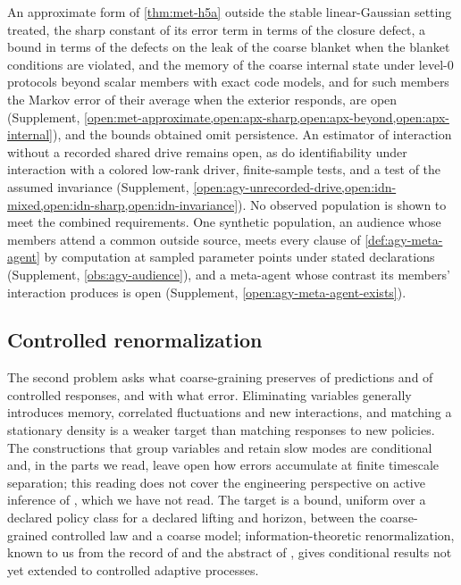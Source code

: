 An approximate form of \cref{thm:met-h5a} outside the stable linear-Gaussian setting treated, the sharp constant of its error term in terms of the closure defect, a bound in terms of the defects on the leak of the coarse blanket when the blanket conditions are violated, and the memory of the coarse internal state under level-0 protocols beyond scalar members with exact code models, and for such members the Markov error of their average when the exterior responds, are open (Supplement, \cref{open:met-approximate,open:apx-sharp,open:apx-beyond,open:apx-internal}), and the bounds obtained omit persistence. An estimator of interaction without a recorded shared drive remains open, as do identifiability under interaction with a colored low-rank driver, finite-sample tests, and a test of the assumed invariance (Supplement, \cref{open:agy-unrecorded-drive,open:idn-mixed,open:idn-sharp,open:idn-invariance}). No observed population is shown to meet the combined requirements. One synthetic population, an audience whose members attend a common outside source, meets every clause of \cref{def:agy-meta-agent} by computation at sampled parameter points under stated declarations (Supplement, \cref{obs:agy-audience}), and a meta-agent whose contrast its members' interaction produces is open (Supplement, \cref{open:agy-meta-agent-exists}).

\subsection{Controlled renormalization}\label{sec:opn-2}

The second problem asks what coarse-graining preserves of predictions and of controlled responses, and with what error. Eliminating variables generally introduces memory, correlated fluctuations and new interactions, and matching a stationary density is a weaker target than matching responses to new policies. The constructions that group variables and retain slow modes \citep{friston2019free,friston2021parcels} are conditional and, in the parts we read, leave open how errors accumulate at finite timescale separation; this reading does not cover the engineering perspective on active inference of \citet{devries2026active}, which we have not read. The target is a bound, uniform over a declared policy class for a declared lifting and horizon, between the coarse-grained controlled law and a coarse model; information-theoretic renormalization, known to us from the record of \citet{lenggenhager2020optimal} and the abstract of \citet{gordon2021relevance}, gives conditional results not yet extended to controlled adaptive processes.

